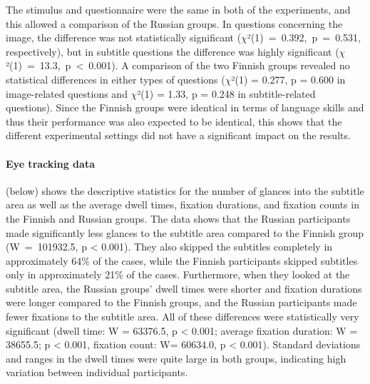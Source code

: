 \documentclass[output=paper]{langsci/langscibook}
\begin{document}
\newpage 
The stimulus and questionnaire were the same in both of the experiments, and this allowed a comparison of the Russian groups. In questions concerning the image, the difference was not statistically significant ($\chi $²(1)~=~0.392,~p~=~0.531, respectively), but in subtitle questions the difference was highly significant ($\chi $²(1)~=~13.3,~p~{\textless}~0.001). A comparison of the two Finnish groups revealed no statistical differences in either types of questions ($\chi $²(1) = 0.277, p = 0.600 in image-related questions and $\chi $²(1) = 1.33, p = 0.248 in subtitle-related questions). Since the Finnish groups were identical in terms of language skills and thus their performance was also expected to be identical, this shows that the different experimental settings did not have a significant impact on the results.

\paragraph{Eye tracking data}

 (below) shows the descriptive statistics for the number of glances into the subtitle area as well as the average dwell times, fixation durations, and fixation counts in the Finnish and Russian groups. The data shows that the Russian participants made significantly less glances to the subtitle area compared to the Finnish group (W~=~101932.5, p {\textless} 0.001). They also skipped the subtitles completely in approximately 64\% of the cases, while the Finnish participants skipped subtitles only in approximately 21\% of the cases. Furthermore, when they looked at the subtitle area, the Russian groups' dwell times were shorter and fixation durations were longer compared to the Finnish groups, and the Russian participants made fewer fixations to the subtitle area. All of these differences were statistically very significant (dwell time: W = 63376.5, p {\textless} 0.001; average fixation duration: W = 38655.5; p {\textless} 0.001, fixation count: W= 60634.0, p {\textless} 0.001). Standard deviations and ranges in the dwell times were quite large in both groups, indicating high variation between individual participants.
\end{document}
